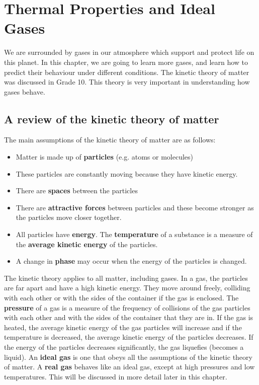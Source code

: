 \chapter{Thermal Properties and Ideal Gases}
\label{chap:gases}

We are surrounded by gases in our atmosphere which support and protect life on this planet. In this chapter, we are going to learn more gases, and learn how to predict their behaviour under different conditions. The kinetic theory of matter was discussed in Grade 10. This theory is very important in understanding how gases behave.\\


\section{A review of the kinetic theory of matter}
\label{sec:gases:kinetic theory}

The main assumptions of the kinetic theory of matter are as follows:
\begin{itemize}[noitemsep]
\item{Matter is made up of \textbf{particles} (e.g.\@{} atoms or molecules)}
\item{These particles are constantly moving because they have kinetic energy.}
\item{There are \textbf{spaces} between the particles}
\item{There are \textbf{attractive forces} between particles and these become stronger as the particles move closer together.}
\item{All particles have \textbf{energy}. The \textbf{temperature} of a substance is a measure of the \textbf{average kinetic energy} of the particles.}
\item{A change in \textbf{phase} may occur when the energy of the particles is changed.}
\end{itemize}

The kinetic theory applies to all matter, including gases. In a gas, the particles are far apart and have a high kinetic energy. They move around freely, colliding with each other or with the sides of the container if the gas is enclosed. The \textbf{pressure} of a gas is a measure of the frequency of collisions of the gas particles with each other and with the sides of the container that they are in. If the gas is heated, the average kinetic energy of the gas particles will increase and if the temperature is decreased, the average kinetic energy of the particles decreases. If the energy of the particles decreases significantly, the gas liquefies (becomes a liquid). An \textbf{ideal gas} is one that obeys all the assumptions of the kinetic theory of matter. A \textbf{real gas} behaves like an ideal gas, except at high pressures and low temperatures. This will be discussed in more detail later in this chapter.

